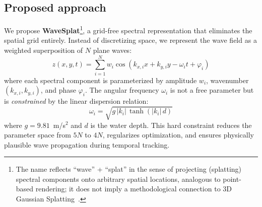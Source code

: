 \documentclass[review]{elsarticle}
\begin{document}
\subsection{Proposed approach}

We propose \textbf{WaveSplat}\footnote{The name reflects ``wave'' +
``splat'' in the sense of projecting (splatting) spectral components
onto arbitrary spatial locations, analogous to point-based rendering;
it does not imply a methodological connection to 3D Gaussian
Splatting~\citep{kerbl2023}.}, a grid-free spectral representation
that eliminates the spatial grid entirely.
Instead of discretizing space, we represent the wave field as a weighted
superposition of $N$ plane waves:
\begin{equation}
  z(x, y, t) = \sum_{i=1}^{N} w_i \cos(k_{x,i} x + k_{y,i} y - \omega_i t + \varphi_i)
  \label{eq:forward}
\end{equation}
where each spectral component is parameterized by amplitude $w_i$,
wavenumber $(k_{x,i}, k_{y,i})$, and phase $\varphi_i$.
The angular frequency $\omega_i$ is not a free parameter but is
\emph{constrained} by the linear dispersion relation:
\begin{equation}
  \omega_i = \sqrt{g \, |k_i| \, \tanh(|k_i| \, d)}
  \label{eq:dispersion}
\end{equation}
where $g = 9.81$~m/s$^2$ and $d$ is the water depth.
This hard constraint reduces the parameter space from $5N$ to $4N$,
regularizes optimization, and ensures physically plausible wave
propagation during temporal tracking.
\end{document}
